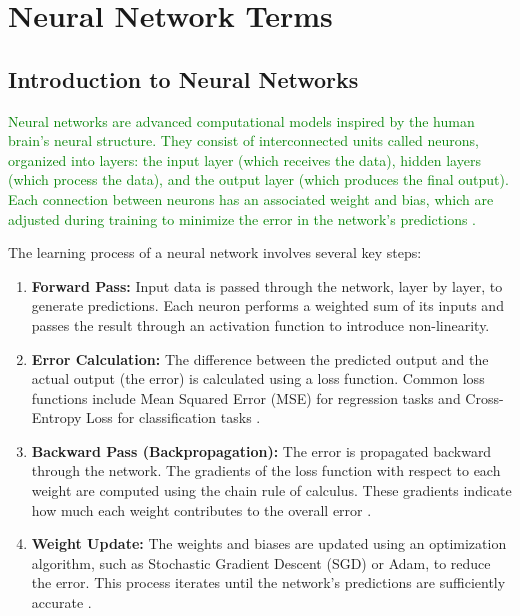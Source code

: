 \documentclass[preprint,12pt]{elsarticle}
\begin{document}
\section{Neural Network Terms}
\label{sec:network_terms}

\subsection{Introduction to Neural Networks}

\textcolor{green}{Neural networks are advanced computational models inspired by the human brain's neural structure. They consist of interconnected units called neurons, organized into layers: the input layer (which receives the data), hidden layers (which process the data), and the output layer (which produces the final output). Each connection between neurons has an associated weight and bias, which are adjusted during training to minimize the error in the network's predictions \cite{lecun2015deep}.}

The learning process of a neural network involves several key steps:

\begin{enumerate}
    \item \textbf{Forward Pass:} Input data is passed through the network, layer by layer, to generate predictions. Each neuron performs a weighted sum of its inputs and passes the result through an activation function to introduce non-linearity.
    \item \textbf{Error Calculation:} The difference between the predicted output and the actual output (the error) is calculated using a loss function. Common loss functions include Mean Squared Error (MSE) for regression tasks and Cross-Entropy Loss for classification tasks \cite{goodfellow2016deep}.
    \item \textbf{Backward Pass (Backpropagation):} The error is propagated backward through the network. The gradients of the loss function with respect to each weight are computed using the chain rule of calculus. These gradients indicate how much each weight contributes to the overall error \cite{rumelhart1986learning}.
    \item \textbf{Weight Update:} The weights and biases are updated using an optimization algorithm, such as Stochastic Gradient Descent (SGD) or Adam, to reduce the error. This process iterates until the network's predictions are sufficiently accurate \cite{kingma2014adam}.
\end{enumerate}
\end{document}
